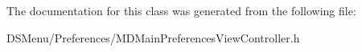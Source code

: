 The documentation for this class was generated from the following file\-:\begin{DoxyCompactItemize}
\item 
D\-S\-Menu/\-Preferences/M\-D\-Main\-Preferences\-View\-Controller.\-h\end{DoxyCompactItemize}
